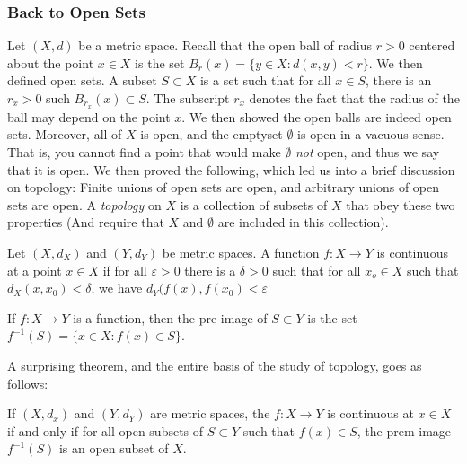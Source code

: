 \documentclass[crop=false,class=article,oneside]{standalone}
\begin{document}
        \subsubsection{Back to Open Sets}
            Let $(X,d)$ be a metric space.
            Recall that the open ball
            of radius $r>0$ centered about the
            point $x\in{X}$ is the set
            $B_{r}(x)=\{y\in{X}:d(x,y)<r\}$.
            We then defined open sets.
            A subset $S\subset{X}$ is a set such that
            for all $x\in{S}$, there is an $r_{x}>0$
            such $B_{r_{x}}(x)\subset{S}$. The subscript
            $r_{x}$ denotes the fact that the radius
            of the ball may depend on the point
            $x$. We then showed the open balls are indeed
            open sets. Moreover, all of $X$ is open,
            and the emptyset $\emptyset$ is open
            in a vacuous sense. That is, you cannot
            find a point that would make $\emptyset$
            \textit{not} open, and thus we say that it
            is open. We then proved the following, which
            led us into a brief discussion on topology:
            Finite unions of open sets are open, and
            arbitrary unions of open sets are open. A
            \textit{topology} on $X$ is a collection of
            subsets of $X$ that obey these two properties
            (And require that $X$ and $\emptyset$ are
            included in this collection).
            \begin{definition}
                Let $(X,d_{X})$ and $(Y,d_{Y})$ be
                metric spaces. A function
                $f:X\rightarrow{Y}$ is continuous
                at a point $x\in{X}$
                if for all $\varepsilon>0$ there is
                a $\delta>0$ such that for all
                $x_{o}\in{X}$ such that
                $d_{X}(x,x_{0})<\delta$, we have
                $d_{Y}(f(x),f(x_{0})<\varepsilon$
            \end{definition}
            \begin{definition}
                If $f:X\rightarrow{Y}$ is a function,
                then the pre-image of
                $S\subset{Y}$ is the set
                $f^{-1}(S)=\{x\in{X}:f(x)\in{S}\}$.
            \end{definition}
            A surprising theorem, and the entire
            basis of the study of topology, goes as
            follows:
            \begin{theorem}
                If $(X,d_{x})$ and $(Y,d_{Y})$
                are metric spaces, the
                $f:X\rightarrow{Y}$ is continuous
                at $x\in{X}$ if and only if
                for all open subsets
                of $S\subset{Y}$ such that
                $f(x)\in{S}$, the prem-image
                $f^{-1}(S)$ is an open subset of $X$.
            \end{theorem}
\end{document}

